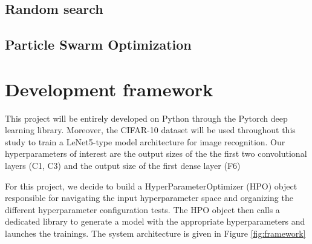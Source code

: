 \documentclass[a4 paper,11pt,2]{article}
\begin{document}
\subsection{Random search}
\subsection{Particle Swarm Optimization}

\section{Development framework}

This project will be entirely developed on Python through the Pytorch deep learning library. Moreover, the CIFAR-10 dataset will be used throughout this study to train a LeNet5-type model architecture for image recognition. Our hyperparameters of interest are the output sizes of the the first two convolutional layers (C1, C3) and the output size of the first dense layer (F6)

For this project, we decide to build a HyperParameterOptimizer (HPO) object responsible for navigating the input hyperparameter space and organizing the different hyperparameter configuration tests. The HPO object then calls a dedicated library to generate a model with the appropriate hyperparameters and launches the trainings. The system architecture is given in Figure \ref{fig:framework}
\end{document}
